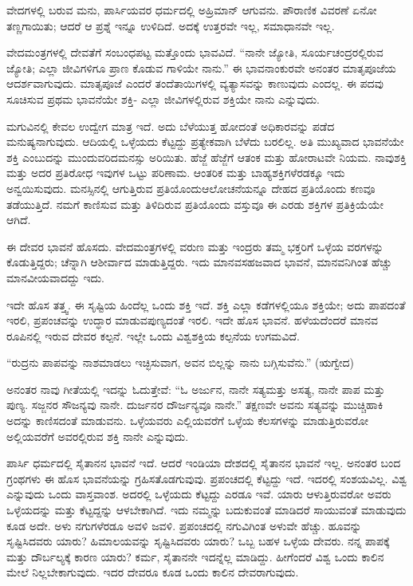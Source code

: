 ವೇದಗಳಲ್ಲಿ ಬರುವ ಮನು, ಪಾರ್ಸಿಯವರ ಧರ್ಮದಲ್ಲಿ ಅಹ್ರಿಮಾನ್​ ಆಗುವನು. ಪೌರಾಣಿಕ ವಿವರಣೆ ಏನೋ ತಣ್ಣಗಾಯಿತು; ಆದರೆ ಆ ಪ್ರಶ್ನೆ ಇನ್ನೂ ಉಳಿದಿದೆ. ಅದಕ್ಕೆ ಉತ್ತರವೇ ಇಲ್ಲ, ಸಮಾಧಾನವೇ ಇಲ್ಲ.

ವೇದಮಂತ್ರಗಳಲ್ಲಿ ದೇವತೆಗೆ ಸಂಬಂಧಪಟ್ಟ ಮತ್ತೊಂದು ಭಾವವಿದೆ. “ನಾನೇ ಜ್ಯೋತಿ, ಸೂರ್ಯಚಂದ್ರರಲ್ಲಿರುವ ಜ್ಯೋತಿ; ಎಲ್ಲಾ ಜೀವಿಗಳಿಗೂ ಪ್ರಾಣ ಕೊಡುವ ಗಾಳಿಯೇ ನಾನು.” ಈ ಭಾವನಾಂಕುರವೇ ಅನಂತರ ಮಾತೃಪೂಜೆಯ ಆದರ್ಶವಾಗುವುದು. ಮಾತೃಪೂಜೆ ಎಂದರೆ ತಂದೆತಾಯಿಗಳಲ್ಲಿ ವ್ಯತ್ಯಾಸವನ್ನು ಕಾಣುವುದು ಎಂದಲ್ಲ. ಈ ಪದವು ಸೂಚಿಸುವ ಪ್ರಥಮ ಭಾವನೆಯೇ ಶಕ್ತಿ- ಎಲ್ಲಾ ಜೀವಿಗಳಲ್ಲಿರುವ ಶಕ್ತಿಯೇ ನಾನು ಎನ್ನುವುದು.

ಮಗುವಿನಲ್ಲಿ ಕೇವಲ ಉದ್ವೇಗ ಮಾತ್ರ ಇದೆ. ಅದು ಬೆಳೆಯುತ್ತ ಹೋದಂತೆ ಅಧಿಕಾರ\-ವನ್ನು ಪಡೆದ ಮನುಷ್ಯನಾಗುವುದು. ಆದಿಯಲ್ಲಿ ಒಳ್ಳೆಯದು ಕೆಟ್ಟದ್ದು ಪ್ರತ್ಯೇಕವಾಗಿ ಬೆಳೆದು ಬರಲಿಲ್ಲ. ಅತಿ ಮುಖ್ಯವಾದ ಭಾವನೆಯೇ ಶಕ್ತಿ ಎಂಬುದನ್ನು ಮುಂದುವರಿದ\break ಮನಸ್ಸು ಅರಿಯಿತು. ಹೆಜ್ಜೆ ಹೆಜ್ಜೆಗೆ ಆತಂಕ ಮತ್ತು ಹೋರಾಟವೇ ನಿಯಮ. ನಾವು\break ಶಕ್ತಿ ಮತ್ತು ಅದರ ಪ್ರತಿರೋಧ ಇವುಗಳ ಒಟ್ಟು ಪರಿಣಾಮ. ಆಂತರಿಕ ಮತ್ತು ಬಾಹ್ಯ\break ಶಕ್ತಿಗಳೆರಡಕ್ಕೂ ಇದು ಅನ್ವಯಿಸುವುದು. ಮನಸ್ಸಿನಲ್ಲಿ ಆಗುತ್ತಿರುವ ಪ್ರತಿಯೊಂದು\break ಆಲೋಚನೆಯನ್ನೂ ದೇಹದ ಪ್ರತಿಯೊಂದು ಕಣವೂ ತಡೆಯುತ್ತಿದೆ. ನಮಗೆ ಕಾಣಿಸುವ ಮತ್ತು ತಿಳಿದಿರುವ ಪ್ರತಿಯೊಂದು ವಸ್ತುವೂ ಈ ಎರಡು ಶಕ್ತಿಗಳ ಪ್ರತಿಕ್ರಿಯೆಯೇ ಆಗಿದೆ.

ಈ ದೇವರ ಭಾವನೆ ಹೊಸದು. ವೇದಮಂತ್ರಗಳಲ್ಲಿ ವರುಣ ಮತ್ತು ಇಂದ್ರರು ತಮ್ಮ ಭಕ್ತರಿಗೆ ಒಳ್ಳೆಯ ವರಗಳನ್ನು ಕೊಡುತ್ತಿದ್ದರು; ಚೆನ್ನಾಗಿ ಆಶೀರ್ವಾದ ಮಾಡುತ್ತಿದ್ದರು. ಇದು ಮಾನವಸಹಜವಾದ ಭಾವನೆ, ಮಾನವನಿಗಿಂತ ಹೆಚ್ಚು ಮಾನವೀಯವಾದದ್ದು ಇದು.

ಇದೇ ಹೊಸ ತತ್ತ್ವ. ಈ ಸೃಷ್ಟಿಯ ಹಿಂದೆಲ್ಲ ಒಂದು ಶಕ್ತಿ ಇದೆ. ಶಕ್ತಿ ಎಲ್ಲಾ ಕಡೆಗಳ\-ಲ್ಲಿಯೂ ಶಕ್ತಿಯೇ; ಅದು ಪಾಪದಂತೆ ಇರಲಿ, ಪ್ರಪಂಚವನ್ನು ಉದ್ಧಾರ ಮಾಡುವ\break ಪುಣ್ಯದಂತೆ ಇರಲಿ. ಇದೇ ಹೊಸ ಭಾವನೆ. ಹಳೆಯದೆಂದರೆ ಮಾನವ ರೂಪಿನಲ್ಲಿ ಇರುವ ದೇವರ ಕಲ್ಪನೆ. ಇಲ್ಲೇ ಒಂದು ವಿಶ್ವಶಕ್ತಿಯ ಕಲ್ಪನೆಯ ಉಗಮವಿದೆ.

“ರುದ್ರನು ಪಾಪವನ್ನು ನಾಶಮಾಡಲು ಇಚ್ಛಿಸುವಾಗ, ಅವನ ಬಿಲ್ಲನ್ನು ನಾನು ಬಗ್ಗಿಸುವೆನು.” (ಋಗ್ವೇದ)

ಅನಂತರ ನಾವು ಗೀತೆಯಲ್ಲಿ ಇದನ್ನು ಓದುತ್ತೇವೆ: “ಓ ಅರ್ಜುನ, ನಾನೇ ಸತ್ಯ\break ಮತ್ತು ಅಸತ್ಯ, ನಾನೇ ಪಾಪ ಮತ್ತು ಪುಣ್ಯ. ಸಜ್ಜನರ ಸೌಜನ್ಯವು ನಾನೇ. ದುರ್ಜನರ ದೌರ್ಜನ್ಯವೂ ನಾನೇ.” ತಕ್ಷಣವೇ ಅವನು ಸತ್ಯವನ್ನು ಮುಚ್ಚಿಹಾಕಿ ಅದನ್ನು ಕಾಣಿಸದಂತೆ ಮಾಡುವನು. ಒಳ್ಳೆಯವರು ಎಲ್ಲಿಯವರೆಗೆ ಒಳ್ಳೆಯ ಕೆಲಸಗಳನ್ನು ಮಾಡುತ್ತಿರುವರೋ ಅಲ್ಲಿಯವರೆಗೆ ಅವರಲ್ಲಿರುವ ಶಕ್ತಿ ನಾನೇ ಎನ್ನುವುದು.

\eject

ಪಾರ್ಸಿ ಧರ್ಮದಲ್ಲಿ ಸೈತಾನನ ಭಾವನೆ ಇದೆ. ಆದರೆ ಇಂಡಿಯಾ ದೇಶದಲ್ಲಿ ಸೈತಾನನ ಭಾವನೆ ಇಲ್ಲ. ಅನಂತರ ಬಂದ ಗ್ರಂಥಗಳು ಈ ಹೊಸ ಭಾವನೆಯನ್ನು ಗ್ರಹಿಸತೊಡಗುವುವು. ಪ್ರಪಂಚದಲ್ಲಿ ಕೆಟ್ಟದ್ದು ಇದೆ. ಇದರಲ್ಲಿ ಸಂಶಯವಿಲ್ಲ. ವಿಶ್ವ ಎನ್ನುವುದು ಒಂದು ವಾಸ್ತವಾಂಶ. ಅದರಲ್ಲಿ ಒಳ್ಳೆಯದು ಕೆಟ್ಟದ್ದು ಎರಡೂ ಇವೆ. ಯಾರು ಆಳುತ್ತಿರುವರೋ ಅವರು ಒಳ್ಳೆಯದನ್ನು ಮತ್ತು ಕೆಟ್ಟದ್ದನ್ನು ಆಳಬೇಕಾಗಿದೆ. ಇದು ನಮ್ಮನ್ನು ಬದುಕುವಂತೆ ಮಾಡಿದರೆ ಸಾಯುವಂತೆ ಮಾಡುವುದು ಕೂಡ ಅದೇ. ಅಳು ನಗುಗಳೆರಡೂ ಅವಳಿ ಜವಳಿ. ಪ್ರಪಂಚದಲ್ಲಿ ನಗುವಿಗಿಂತ ಅಳುವೇ ಹೆಚ್ಚು. ಹೂವನ್ನು ಸೃಷ್ಟಿಸಿದವರು ಯಾರು? ಹಿಮಾಲಯವನ್ನು ಸೃಷ್ಟಿಸಿದವರು ಯಾರು? ಒಬ್ಬ ಬಹಳ ಒಳ್ಳೆಯ ದೇವರು. ನನ್ನ ಪಾಪಕ್ಕೆ ಮತ್ತು ದೌರ್ಬಲ್ಯಕ್ಕೆ ಕಾರಣ ಯಾರು? ಕರ್ಮ, ಸೈತಾನನೇ ಇದನ್ನೆಲ್ಲ ಮಾಡಿದ್ದು. ಹೀಗೆಂದರೆ ವಿಶ್ವ ಒಂದು ಕಾಲಿನ ಮೇಲೆ ನಿಲ್ಲಬೇಕಾಗುವುದು. ಇದರ ದೇವರೂ ಕೂಡ ಒಂದು ಕಾಲಿನ ದೇವರಾಗುವುದು.

